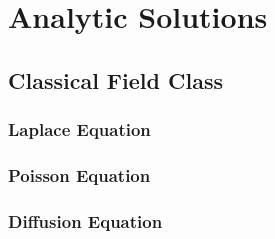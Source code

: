 \clearemptydoublepage
\chapter{Analytic Solutions}
\label{cha:analyticsolutions}

\section{Classical Field Class}

\subsection{Laplace Equation}

\subsection{Poisson Equation}

\subsection{Diffusion Equation}

